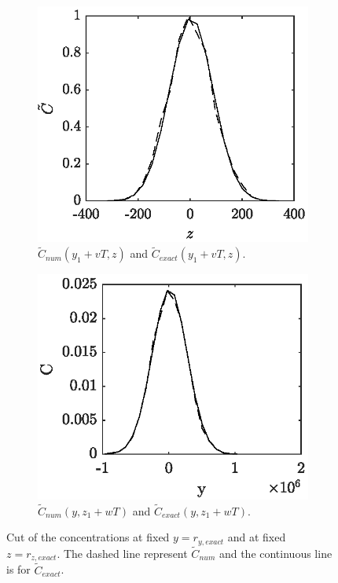 \begin{figure}[H]
	\centering
	\begin{subfigure}[b]{0.49\textwidth}
		\includegraphics[width=\textwidth]{fig/testcase/testcase_fixedy.eps}
		\caption{$\tilde C_{num}(y_1+vT,z)$ and $\tilde C_{exact}(y_1+vT,z)$.}
		\label{fig:testcase_fixedy}
	\end{subfigure}
	\begin{subfigure}[b]{0.49\textwidth}
		\includegraphics[width=\textwidth]{fig/testcase/testcase_fixedz.eps}
		\caption{$\tilde C_{num}(y,z_1+wT)$ and $\tilde C_{exact}(y,z_1+wT)$.}
		\label{fig:testcase_fixedz}
	\end{subfigure}
	\caption{Cut of the concentrations at fixed $y = r_{y,exact}$ and at fixed $z = r_{z,exact}$. The dashed line represent $\tilde C_{num}$ and the continuous line is for $\tilde C_{exact}$.}
\end{figure}


